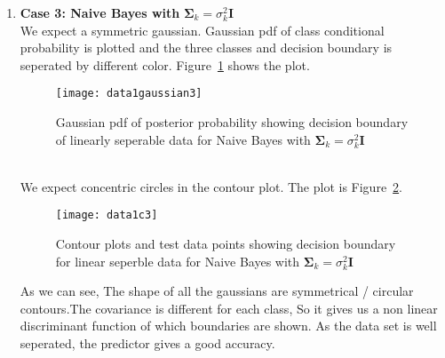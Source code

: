 \documentclass[11pt,paper=a4,answers]{exam}
\begin{document}
\begin{questions}
\begin{enumerate}[i.]
\begin{enumerate}
            \item \textbf{Case 3: Naive Bayes with} $\bm{\Sigma}_k = \sigma_k^2\bm{I}$\\
            We expect a symmetric gaussian. Gaussian pdf of class conditional probability is plotted and the three classes and decision boundary is seperated by different color. Figure~\ref{fig:data1g3} shows the plot.
            \begin{figure}[ht]
                \centering
                \texttt{[image: data1gaussian3]}
                \vspace{-30pt}
                \caption{Gaussian pdf of posterior probability showing decision boundary of linearly seperable data for Naive Bayes with $\bm{\Sigma}_k = \sigma_k^2\bm{I}$}
                \label{fig:data1g3}
            \end{figure}\\
            We expect concentric circles in the contour plot. The plot is Figure~\ref{fig:data1c3}.
            \begin{figure}[ht]
                \centering
                \texttt{[image: data1c3]}
                \vspace{-30pt}
                \caption{Contour plots and test data points showing decision boundary for linear seperble data for Naive Bayes with $\bm{\Sigma}_k = \sigma_k^2\bm{I}$}
                \label{fig:data1c3}
            \end{figure}
            As we can see, The shape of all the gaussians are symmetrical / circular contours.The covariance is different for each class, So it gives us a non linear discriminant function of which boundaries are shown. As the data set is well seperated, the predictor gives a good accuracy.\\


\end{enumerate}
\end{enumerate}
\end{questions}
\end{document}
